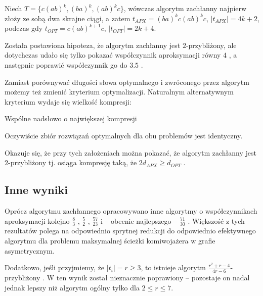 Niech $T = \{c(ab)^k, (ba)^k, (ab)^kc\}$, wówczas algorytm zachłanny najpierw złoży ze sobą dwa skrajne ciągi, a zatem $t_{APX} = (ba)^kc(ab)^kc$, $|t_{APX}| = 4 k + 2$, podczas gdy $t_{OPT} = c(ab)^{k + 1}c$, $|t_{OPT}| = 2 k + 4$.

Została postawiona hipoteza, że algorytm zachłanny jest $2$-przybliżony, ale dotychczas udało się tylko pokazać współczynnik aproksymacji równy $4$ \citep{blum1994linear}, a następnie poprawić współczynnik go do $3.5$ \citep{kaplan2005approximation}.

Zamiast porównywać długości słowa optymalnego i zwróconego przez algorytm możemy też zmienić kryterium optymalizacji.
Naturalnym alternatywnym kryterium wydaje się wielkość kompresji:

\begin{algorithm}[H]
    \caption{Wspólne nadsłowo o największej kompresji}
\end{algorithm}
Oczywiście zbiór rozwiązań optymalnych dla obu problemów jest identyczny.

Okazuje się, że przy tych założeniach można pokazać, że algorytm zachłanny jest $2$-przybliżony tj. osiąga kompresję taką, że $2 d_{APX} \ge d_{OPT}$ \citep{tarhio1988greedy}.

\subsection{Inne wyniki}

Oprócz algorytmu zachłannego opracowywano inne algorytmy o współczynnikach aproksymacji kolejno $\frac{8}{3}$ \citep{armen19962}, $\frac{5}{2}$ \citep{kaplan2005approximation, sweedyk2000boldmath}, $\frac{57}{23}$ \citep{mucha2013lyndon} i -- obecnie najlepszego -- $\frac{71}{30}$ \citep{paluch2014better}.
Większość z tych rezultatów polega na odpowiednio sprytnej redukcji do odpowiednio efektywnego algorytmu dla problemu maksymalnej ścieżki komiwojażera w grafie asymetrycznym.

Dodatkowo, jeśli przyjmiemy, że $|t_i| = r \ge 3$, to istnieje algorytm $\frac{r^2 + r - 4}{4r - 6}$-przybliżony \citep{golovnev2013approximating}. W \citet{braquelaire2018improving} ten wynik został nieznacznie poprawiony -- pozostaje on nadal jednak lepszy niż algorytm ogólny tylko dla $2 \le r \le 7$.
